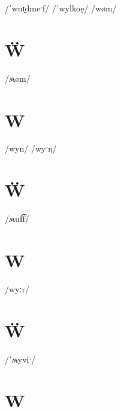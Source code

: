 \documentclass[10pt,a4paper,twoside]{book}
\begin{document}
\begin{multicols}{3}
 {/ˈwuɪ̯dmeˑf/} {}
 {/ˈwylkoe̯/} {}
 {/wøm/} {}
\end{multicols}

\section*{Ẅ}

\begin{multicols}{3}
 {/ʍøm/} {}
\end{multicols}

\section*{W}

\begin{multicols}{3}
 {/wyn/} {}
 {/wyˑŋ/} {}
\end{multicols}

\section*{Ẅ}

\begin{multicols}{3}
 {/ʍuf͡f/} {}
\end{multicols}

\section*{W}

\begin{multicols}{3}
 {/wyːr/} {}
\end{multicols}

\section*{Ẅ}

\begin{multicols}{3}
 {/ˈʍyviˑ/} {}
\end{multicols}

\section*{W}
\end{document}

